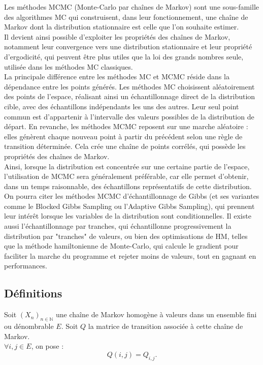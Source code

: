 \documentclass{article}
\begin{document}
Les méthodes MCMC (Monte-Carlo par chaînes de Markov) sont une sous-famille des algorithmes MC qui construisent, dans leur fonctionnement, une chaîne de Markov dont la distribution stationnaire est celle que l'on souhaite estimer. \\
Il devient ainsi possible d'exploiter les propriétés des chaînes de Markov, notamment leur convergence vers une distribution stationnaire et leur propriété d'ergodicité, qui peuvent être plus utiles que la loi des grands nombres seule, utilisée dans les méthodes MC classiques. \\
La principale différence entre les méthodes MC et MCMC réside dans la dépendance entre les points générés. Les méthodes MC choisissent aléatoirement des points de l'espace, réalisant ainsi un échantillonnage direct de la distribution cible, avec des échantillons indépendants les uns des autres. Leur seul point commun est d'appartenir à l'intervalle des valeurs possibles de la distribution de départ. En revanche, les méthodes MCMC reposent sur une marche aléatoire : elles génèrent chaque nouveau point à partir du précédent selon une règle de transition déterminée. Cela crée une chaîne de points corrélés, qui possède les propriétés des chaînes de Markov. \\
Ainsi, lorsque la distribution est concentrée sur une certaine partie de l'espace, l'utilisation de MCMC sera généralement préférable, car elle permet d'obtenir, dans un temps raisonnable, des échantillons représentatifs de cette distribution. \\

On pourra citer les méthodes MCMC d'échantillonnage de Gibbs (et ses variantes comme le Blocked Gibbs Sampling ou l'Adaptive Gibbs Sampling), qui prennent leur intérêt lorsque les variables de la distribution sont conditionnelles. Il existe aussi l'échantillonnage par tranches, qui échantillonne progressivement la distribution par "tranches" de valeurs, ou bien des optimisations de HM, telles que la méthode hamiltonienne de Monte-Carlo, qui calcule le gradient pour faciliter la marche du programme et rejeter moins de valeurs, tout en gagnant en performances. \\

\subsection{Définitions}

\begin{tcolorbox}[colback=white,colframe=blue!80!black,title=Notation]
Soit $(X_n)_{n \in \mathbb{N}}$ une chaîne de Markov homogène à valeurs dans un ensemble fini ou dénombrable $E$.
Soit $Q$ la matrice de transition associée à cette chaîne de Markov. \\

$\forall i, j \in E$, on pose :
\[
Q(i,j) = Q_{i,j}.
\]
\end{tcolorbox}
\end{document}
